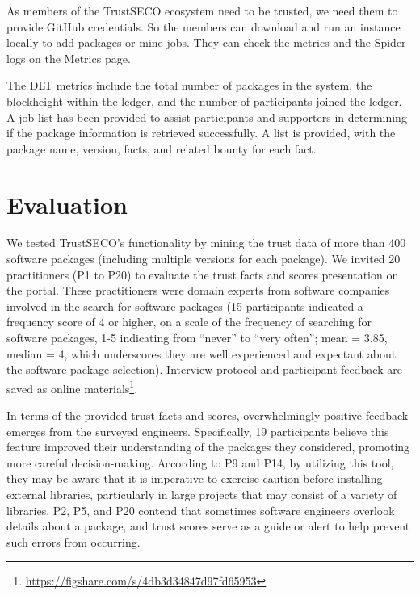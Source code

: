 \documentclass[10pt,conference]{IEEEtran}
\begin{document}
As members of the TrustSECO ecosystem need to be trusted, we need them to provide GitHub credentials. So the members can download and run an instance locally to add packages or mine jobs. They can check the metrics and the Spider logs on the Metrics page.

The DLT metrics include the total number of packages in the system, the blockheight within the ledger, and the number of participants joined the ledger. A job list has been provided to assist participants and supporters in determining if the package information is retrieved successfully. A list is provided, with the package name, version, facts, and related bounty for each fact.
\section{Evaluation}
\label{evaluation}

We tested TrustSECO's functionality by mining the trust data of more than 400 software packages (including multiple versions for each package). We invited 20 practitioners (P1 to P20) to evaluate the trust facts and scores presentation on the portal. These practitioners were domain experts from software companies involved in the search for software packages (15 participants indicated a frequency score of 4 or higher, on a scale of the frequency of searching for software packages, 1-5 indicating from ``never'' to ``very often''; mean = 3.85, median = 4, which underscores they are well experienced and expectant about the software package selection). Interview protocol and participant feedback are saved as online materials\footnote{\url{https://figshare.com/s/4db3d34847d97fd65953}}.

In terms of the provided trust facts and scores, overwhelmingly positive feedback emerges from the surveyed engineers. Specifically, 19 participants believe this feature improved their understanding of the packages they considered, promoting more careful decision-making. According to P9 and P14, by utilizing this tool, they may be aware that it is imperative to exercise caution before installing external libraries, particularly in large projects that may consist of a variety of libraries. P2, P5, and P20 contend that sometimes software engineers overlook details about a package, and trust scores serve as a guide or alert to help prevent such errors from occurring.
\end{document}
